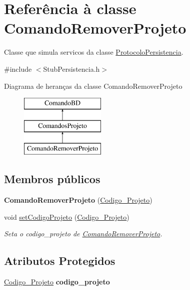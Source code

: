 \hypertarget{class_comando_remover_projeto}{
\section{\-Referência à classe \-Comando\-Remover\-Projeto}
\label{class_comando_remover_projeto}
}


\-Classe que simula servicos da classe \hyperlink{class_protocolo_persistencia}{\-Protocolo\-Persistencia}.  




{\ttfamily \#include $<$\-Stub\-Persistencia.\-h$>$}

\-Diagrama de heranças da classe \-Comando\-Remover\-Projeto\begin{figure}[H]
\begin{center}
\leavevmode
\includegraphics[height=3.000000cm]{class_comando_remover_projeto}
\end{center}
\end{figure}
\subsection*{\-Membros públicos}
\begin{DoxyCompactItemize}
\item 
\hypertarget{class_comando_remover_projeto_a236f2601156f9a0f7f6b8cfd583c6dc0}{
{\bfseries \-Comando\-Remover\-Projeto} (\hyperlink{class_codigo___projeto}{\-Codigo\-\_\-\-Projeto})}
\label{class_comando_remover_projeto_a236f2601156f9a0f7f6b8cfd583c6dc0}

\item 
void \hyperlink{class_comando_remover_projeto_adb33763c4dc424b59815d2d9dd18b966}{set\-Codigo\-Projeto} (\hyperlink{class_codigo___projeto}{\-Codigo\-\_\-\-Projeto})
\begin{DoxyCompactList}\small\item\em \-Seta o codigo\-\_\-projeto de \hyperlink{class_comando_remover_projeto}{\-Comando\-Remover\-Projeto}. \end{DoxyCompactList}\end{DoxyCompactItemize}
\subsection*{\-Atributos \-Protegidos}
\begin{DoxyCompactItemize}
\item 
\hypertarget{class_comando_remover_projeto_a8f22915758ba1242ae23943f392ff69a}{
\hyperlink{class_codigo___projeto}{\-Codigo\-\_\-\-Projeto} {\bfseries codigo\-\_\-projeto}}
\label{class_comando_remover_projeto_a8f22915758ba1242ae23943f392ff69a}

\end{DoxyCompactItemize}


